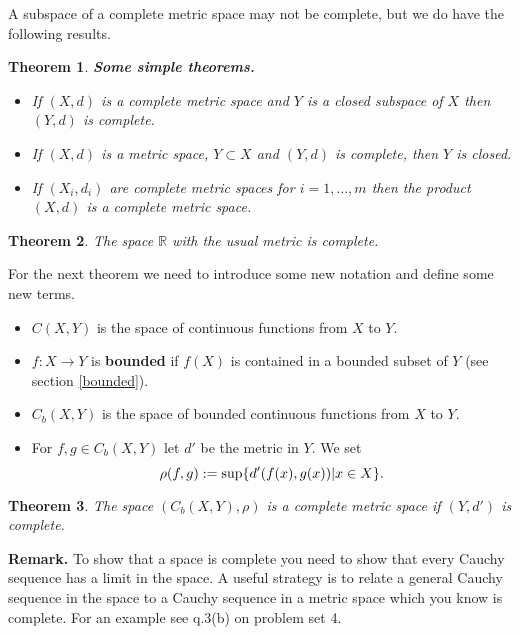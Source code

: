 \documentclass[two column]{article}
\newtheorem{theorem}{Theorem}[subsection]
\begin{document}
A subspace of a complete metric space may not be complete, but we do have the following results. \\

\begin{theorem}
{\bf Some simple theorems.}
\begin{itemize}
\item If $(X,d)$ is a complete metric space and $Y$ is a closed subspace of $X$ then $(Y,d)$ is complete. 
\item If $(X,d)$ is a metric space, $Y \subset X$ and $(Y,d)$ is complete, then $Y$ is closed. 
\item If $(X_{i},d_{i})$ are complete metric spaces for $i=1,\dots, m$ then the product $(X,d)$ is a complete metric space. \\
\end{itemize}
\end{theorem}

\begin{theorem}
The space $\mathbb{R}$ with the usual metric is complete. \vspace{6pt}
\end{theorem}

For the next theorem we need to introduce some new notation and define some new terms.
\begin{itemize}
\item $C(X,Y)$ is the space of continuous functions from $X$ to $Y$. 
\item $f:X \rightarrow Y$ is {\bf bounded} if $f(X)$ is contained in a bounded subset of $Y$ (see section \ref{bounded}). 
\item $C_{b}(X,Y)$ is the space of bounded continuous functions from $X$ to $Y$. 
\item For $f,g \in C_{b}(X,Y)$ let $d'$ be the metric in $Y$. We set \vspace{-6pt}
\[ \rho(f,g) := \sup \{ d'(f(x),g(x)) \vert x \in X \}. \vspace{+6pt} \]
\end{itemize}

\begin{theorem}
The space $(C_{b}(X,Y), \rho)$ is a complete metric space if $(Y,d')$ is complete.
\end{theorem}

{\bf Remark.} To show that a space is complete you need to show that every Cauchy sequence has a limit in the space. A useful strategy is to relate a general Cauchy sequence in the space to a Cauchy sequence in a metric space which you know is complete. For an example see q.3(b) on problem set 4. 
\end{document}
